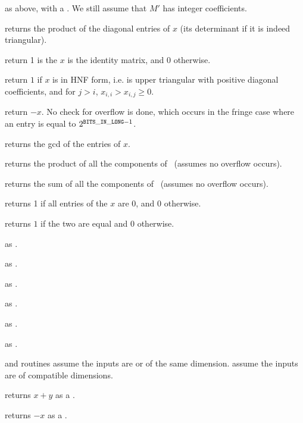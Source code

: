  as above, with  a . We
still assume that $M'$ has integer coefficients.

 returns the product of the diagonal
entries of $x$ (its determinant if it is indeed triangular).

 return 1 is the  $x$ is the
identity matrix, and 0 otherwise.

 return $1$ if $x$ is in HNF form, i.e. is upper
triangular with positive diagonal coefficients, and  for $j>i$,
$x_{i,i}>x_{i,j} \ge 0$.


 return $-x$. No check for overflow is done, which
occurs in the fringe case where an entry is equal to $2^{{\tt BITS\_IN\_LONG}-1}$.

 returns the gcd of the entries of $x$.

 returns the product of all the components
of~ (assumes no overflow occurs).

 returns the sum of all the components
of~ (assumes no overflow occurs).

 returns 1 if all entries of the  $x$ are $0$,
and $0$ otherwise.

 returns $1$ if the two  are equal
and $0$ otherwise.

 as .

 as .

 as .

 as .

 as .

 as .


 and  routines assume the inputs are  or 
of the same dimension.  assume the inputs are  of
compatible dimensions.

 returns $x + y$ as a .

 returns $-x$ as a .

